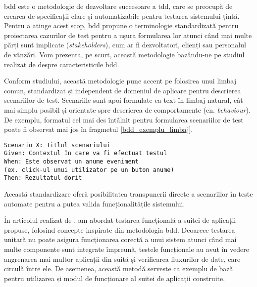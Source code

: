 \acrfull{bdd} este o metodologie de dezvoltare succesoare a \acrfull{tdd}, care se preocupă de crearea de specificații clare și automatizabile pentru testarea sistemului țintă. Pentru a atinge acest scop, \acrshort{bdd} propune o terminologie standardizată pentru proiectarea cazurilor de test pentru a ușura formularea lor atunci când mai multe părți sunt implicate (\textit{stakeholders}), cum ar fi dezvoltatori, clienți sau personalul de vânzări. Vom prezenta, pe scurt, această metodologie bazându-ne pe studiul realizat de \citet{Solis2011} despre caracteristicile \acrshort{bdd}.

Conform studiului, această metodologie pune accent pe folosirea unui limbaj comun, standardizat și independent de domeniul de aplicare pentru descrierea scenariilor de test. Scenariile sunt apoi formulate ca text în limbaj natural, cât mai simplu posibil și orientate spre descrierea de comportamente (en. \textit{behaviour}). De exemplu, formatul cel mai des întâlnit pentru formularea scenariilor de test poate fi observat mai jos în fragmetul \ref{bdd_exemplu_limbaj}.

\begin{lstlisting}[caption={Structură comună a unui scenariu de test folosind BDD}, label={bdd_exemplu_limbaj}]
Scenario X: Titlul scenariului
Given: Contextul în care va fi efectuat testul
When: Este observat un anume eveniment 
(ex. click-ul unui utilizator pe un buton anume)
Then: Rezultatul dorit
\end{lstlisting}

Această standardizare oferă posibilitatea transpunerii directe a scenariilor în teste automate pentru a putea valida funcționalitățile sistemului.

În articolul realizat de \citet{Cristea2022}, am abordat testarea funcțională a suitei de aplicații propuse, folosind concepte inspirate din metodologia \acrshort{bdd}. Deoarece testarea unitară nu poate asigura funcționarea corectă a unui sistem atunci când mai multe componente sunt integrate împreună, testele funcționale au avut în vedere angrenarea mai multor aplicații din suită și verificarea fluxurilor de date, care circulă între ele. De asemenea, această metodă servește ca exemplu de bază pentru utilizarea și modul de funcționare al suitei de aplicații construite.

